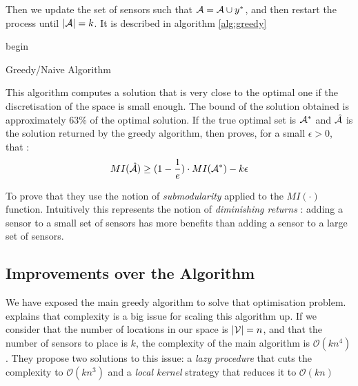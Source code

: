 Then we update the set of sensors such that $\mathcal{A} = \mathcal{A} \cup y^*$, and then restart the process until $|\mathcal{A}| = k$. It is described in algorithm \ref{alg:greedy}  \\

\begin{algorithm}[h!]
 begin\;
 \caption{Greedy/Naive Algorithm}
 \label{alg:greedy}
\end{algorithm}


This algorithm computes a solution that is very close to the optimal one if the discretisation of the space is small enough. The bound of the solution obtained is approximately 63\% of the optimal solution. If the true optimal set is $\mathcal{A}^*$ and $\hat{\mathcal{A}}$ is the solution returned by the greedy algorithm, then \citet{krause_near-optimal_2008} proves, for a small $\epsilon >0 $, that : 
 \begin{equation}
    MI(\hat{\mathcal{A}}) \geq (1 - \frac{1}{e}) \cdot MI(\mathcal{A}^*) - k\epsilon
\end{equation}

To prove that they use the notion of \textit{submodularity} \citep{nemhauser_analysis_1978} applied to the $MI(\cdot)$ function. Intuitively this represents the notion of \textit{diminishing returns} :  adding a sensor to a small set of sensors has more benefits than adding a sensor to a large set of sensors. 


\subsection{Improvements over the Algorithm}



We have exposed the main greedy algorithm to solve that optimisation problem. \citet{krause_near-optimal_2008} explains that complexity is a big issue for scaling this algorithm up. If we consider that the number of locations in our space is $|\mathcal{V}| = n$, and that the number of sensors to place is $k$, the complexity of the main algorithm is $\mathcal{O}(kn^4)$. They propose two solutions to this issue: a \textit{lazy procedure} that cuts the complexity to  $\mathcal{O}(kn^3)$ and a \textit{local kernel} strategy that reduces it to $\mathcal{O}(kn)$


